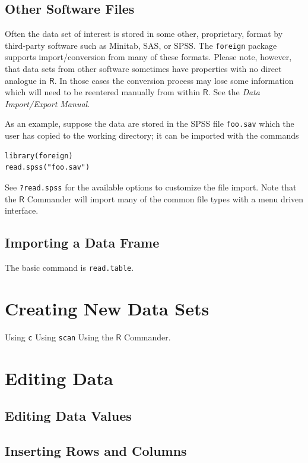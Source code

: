 \documentclass[captions=tableheading]{scrbook}
\begin{document}
\begin{example}
\subsection{Other Software Files}
\label{sec-20-2-3}

Often the data set of interest is stored in some other, proprietary, format by third-party software such as Minitab, SAS, or SPSS. The \texttt{foreign} package supports import/conversion from many of these formats. Please note, however, that data sets from other software sometimes have properties with no direct analogue in \(\mathsf{R}\). In those cases the conversion process may lose some information which will need to be reentered manually from within \(\mathsf{R}\). See the \emph{Data Import/Export Manual}.

As an example, suppose the data are stored in the SPSS file \texttt{foo.sav} which the user has copied to the working directory; it can be imported with the commands


\begin{verbatim}
library(foreign)
read.spss("foo.sav")
\end{verbatim}

See \texttt{?read.spss} for the available options to customize the file import. Note that the \(\mathsf{R}\) Commander will import many of the common file types with a menu driven interface.
\subsection{Importing a Data Frame}
\label{sec-20-2-4}


The basic command is \texttt{read.table}.
\section{Creating New Data Sets}
\label{sec-20-3}
\label{sec-Creating-New-Data}


Using \texttt{c}
Using \texttt{scan}
Using the \(\mathsf{R}\) Commander.
\section{Editing Data}
\label{sec-20-4}
\label{sec-Editing-Data-Sets}
\subsection{Editing Data Values}
\label{sec-20-4-1}
\subsection{Inserting Rows and Columns}
\label{sec-20-4-2}

\end{example}
\end{document}
